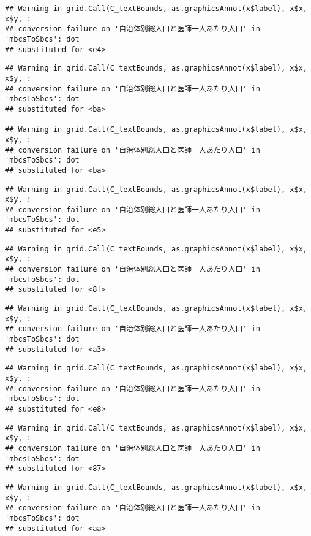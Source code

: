\documentclass[
]{article}
\begin{document}
\begin{verbatim}
## Warning in grid.Call(C_textBounds, as.graphicsAnnot(x$label), x$x, x$y, :
## conversion failure on '自治体別総人口と医師一人あたり人口' in 'mbcsToSbcs': dot
## substituted for <e4>
\end{verbatim}

\begin{verbatim}
## Warning in grid.Call(C_textBounds, as.graphicsAnnot(x$label), x$x, x$y, :
## conversion failure on '自治体別総人口と医師一人あたり人口' in 'mbcsToSbcs': dot
## substituted for <ba>

## Warning in grid.Call(C_textBounds, as.graphicsAnnot(x$label), x$x, x$y, :
## conversion failure on '自治体別総人口と医師一人あたり人口' in 'mbcsToSbcs': dot
## substituted for <ba>
\end{verbatim}

\begin{verbatim}
## Warning in grid.Call(C_textBounds, as.graphicsAnnot(x$label), x$x, x$y, :
## conversion failure on '自治体別総人口と医師一人あたり人口' in 'mbcsToSbcs': dot
## substituted for <e5>
\end{verbatim}

\begin{verbatim}
## Warning in grid.Call(C_textBounds, as.graphicsAnnot(x$label), x$x, x$y, :
## conversion failure on '自治体別総人口と医師一人あたり人口' in 'mbcsToSbcs': dot
## substituted for <8f>
\end{verbatim}

\begin{verbatim}
## Warning in grid.Call(C_textBounds, as.graphicsAnnot(x$label), x$x, x$y, :
## conversion failure on '自治体別総人口と医師一人あたり人口' in 'mbcsToSbcs': dot
## substituted for <a3>
\end{verbatim}

\begin{verbatim}
## Warning in grid.Call(C_textBounds, as.graphicsAnnot(x$label), x$x, x$y, :
## conversion failure on '自治体別総人口と医師一人あたり人口' in 'mbcsToSbcs': dot
## substituted for <e8>
\end{verbatim}

\begin{verbatim}
## Warning in grid.Call(C_textBounds, as.graphicsAnnot(x$label), x$x, x$y, :
## conversion failure on '自治体別総人口と医師一人あたり人口' in 'mbcsToSbcs': dot
## substituted for <87>
\end{verbatim}

\begin{verbatim}
## Warning in grid.Call(C_textBounds, as.graphicsAnnot(x$label), x$x, x$y, :
## conversion failure on '自治体別総人口と医師一人あたり人口' in 'mbcsToSbcs': dot
## substituted for <aa>
\end{verbatim}
\end{document}
